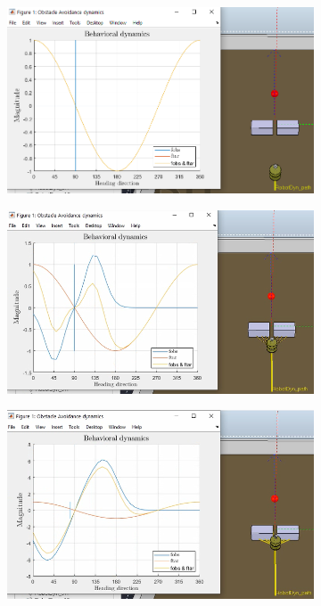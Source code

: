 \begin{figure}[htb!]
  \centering
  \begin{subfigure}{.45\textwidth}
    \includegraphics[width=\textwidth]{img/3-2-3-1.PNG}
    \caption{}%
    \label{fig:obs-tar-nonlinear-behavioral-10-1}
  \end{subfigure}
  \begin{subfigure}{.45\textwidth}
    \includegraphics[width=\textwidth]{img/3-2-3-2.PNG}
    \caption{}%
    \label{fig:obs-tar-nonlinear-behavioral-10-2}
  \end{subfigure}
    \begin{subfigure}{.45\textwidth}
      \includegraphics[width=\textwidth]{img/3-2-3-3.PNG}

\end{subfigure}
\end{figure}

